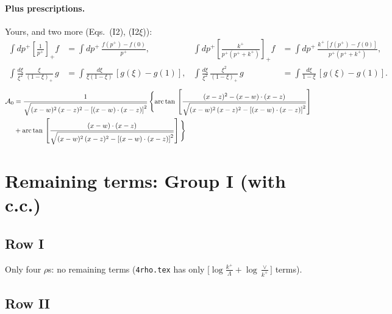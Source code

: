 \documentclass[10pt]{article}
\numberwithin{equation}{section}
\begin{document}
\paragraph{Plus prescriptions.} Yours, and two more (Eqs.~(I2), (I2$\xi$)):
\begin{align*}
\int dp^+\left[\frac{1}{p^+}\right]_+f&=\int dp^+\,\frac{f(p^+)-f(0)}{p^+},&
\int dp^+\left[\frac{k^+}{p^+(p^++k^+)}\right]_+f&=\int dp^+\,\frac{k^+\,[f(p^+)-f(0)]}{p^+(p^++k^+)},\\
\int\frac{d\xi}{\xi^2}\,\frac{\xi}{(1-\xi)_+}\,g&=\int\frac{d\xi}{\xi(1-\xi)}\,[g(\xi)-g(1)],&
\int\frac{d\xi}{\xi^2}\,\frac{\xi^2}{(1-\xi)_+}\,g&=\int\frac{d\xi}{1-\xi}\,[g(\xi)-g(1)].
\end{align*}
\begin{align}
\mathcal{A}_{0} & = \frac{1}{\sqrt{(x-w)^{2}\,(x-z)^{2}-\left[(x-w)\cdot (x-z)\right]^{2}}}\, \Bigg\{\mathrm{arc\,tan}\,\left[\frac{(x-z)^{2}-(x-w)\cdot (x-z)}{\sqrt{(x-w)^{2}\,(x-z)^{2}-\left[(x-w)\cdot (x-z)\right]^{2}}}\right]\notag \\ & + \mathrm{arc\,tan}\,\left[\frac{(x-w)\cdot (x-z)}{\sqrt{(x-w)^{2}\,(x-z)^{2}-\left[(x-w)\cdot (x-z)\right]^{2}}}\right] \Bigg\}
\label{eq:A0}
\end{align}

\section{Remaining terms: Group I (with c.c.)}\label{sec:FgI}
\subsection{Row I}
Only four $\rho$\textquotesingle s: no remaining terms (\texttt{4rho.tex} has only $\big[\log\frac{k^+}{\Lambda}+\log\frac{\vee}{k^+}\big]$ terms).
\subsection{Row II}
\end{document}
